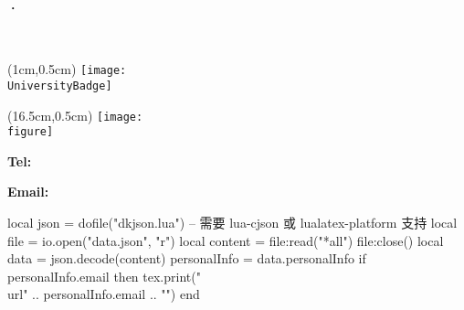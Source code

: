 \documentclass[10pt, a4paper, oneside]{ctexart}
\begin{document}
\gdef\iconAlignWide{1.5em}

\begin{center}
    \begin{minipage}[t][6em]{1\textwidth}
        \ifdefined\noUniversityBadge
            \hspace{2em}
            {\Huge \textbf{\myname·\mytitle}}\\[1ex]
        \else
            \begin{center}
                {\Huge \textbf{\myname}}\\[1ex]
            \end{center}
            \begin{textblock*}{3cm}(1cm,0.5cm)  %
                \texttt{[image: \\UniversityBadge]}  %
            \end{textblock*}
        \fi
        \ifdefined\personalPhoto
        \begin{textblock*}{2.5cm}(16.5cm,0.5cm)  %
            \texttt{[image: \\figure]}  %
        \end{textblock*}
        \fi
        \vfil
        \begin{center}
            \begin{minipage}{1\textwidth}
                \centering
                \begin{minipage}{0.5\linewidth}
                    \textbf{Tel:} \tel
                \end{minipage}
                \hfill\begin{minipage}{0.5\linewidth}
                    \textbf{Email:}
                    \begin{luacode}
                        local json = dofile("dkjson.lua")  -- 需要 lua-cjson 或 lualatex-platform 支持
                        local file = io.open("data.json", "r")
                        local content = file:read("*all")
                        file:close()
                        local data = json.decode(content)
                        personalInfo = data.personalInfo
                        if personalInfo.email then
                            tex.print("\\url{" .. personalInfo.email .. "}")
                        end
                    \end{luacode}
                \end{minipage}
            \end{minipage}
        \end{center}
    \end{minipage}\\[1.5em]
\end{center}
\end{document}
